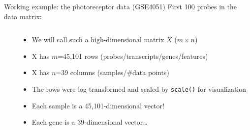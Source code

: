 \documentclass[
  ignorenonframetext,
  aspectratio=169]{beamer}
\begin{document}
\begin{frame}[fragile]{Working example: the photoreceptor data
(GSE4051)}
\protect\hypertarget{working-example-the-photoreceptor-data-gse4051}{}
First 100 probes in the data matrix:

\begin{columns}[T]
\begin{column}{.25\textwidth}
\scriptsize


\normalsize

\scriptsize


\normalsize
\end{column}

\begin{column}{.65\textwidth}
\begin{itemize}
\item
  We will call such a high-dimensional matrix \(X\) (\(m \times n\))
\item
  X has \(m\)=45,101 rows (probes/transcripts/genes/features)
\item
  X has \(n\)=39 columns (samples/\#data points)
\item
  The rows were log-transformed and scaled by \texttt{scale()} for
  visualization
\item
  Each sample is a 45,101-dimensional vector!
\item
  Each gene is a 39-dimensional vector\ldots{}
\end{itemize}
\end{column}
\end{columns}
\end{frame}
\end{document}
